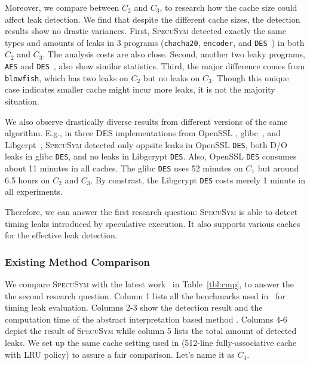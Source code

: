 \documentclass[sigconf]{acmart}
\newcommand{\SpecuSym}{\textsc{SpecuSym} }
\begin{document}
Moreover, we compare between $C_2$ and $C_3$, to research how the cache size 
could affect leak detection. We find that despite the different cache sizes, 
the detection results show no drastic variances. First, \SpecuSym detected 
exactly the same types and amounts of leaks in 3 programs (\texttt{chacha20}, 
\texttt{encoder}, and \texttt{DES}~\cite{OpenSSL111c}) in both $C_2$ and
$C_3$. The analysis costs are also close. Second, another two leaky programs, 
\texttt{AES} and \texttt{DES}~\cite{glibc}, also show similar statistics.
Third, the major difference comes from \texttt{blowfish}, which has two 
leaks on $C_2$ but no leaks on $C_3$. Though this unique case indicates 
smaller cache might incur more leaks, it is not the majority situation. 

We also observe drastically diverse results from different versions of 
the same algorithm. E.g., in three DES implementations from OpenSSL
\cite{OpenSSL111c}, glibc~\cite{glibc}, and Libgcrpt~\cite{Libgcrypt}, 
\SpecuSym detected only oppsite leaks in OpenSSL \texttt{DES}, both D/O 
leaks in glibc \texttt{DES}, and no leaks in Libgcrypt \texttt{DES}. Also, 
OpenSSL \texttt{DES} consumes about 11 minutes in all caches. The glibc 
\texttt{DES} uses 52 minutes on $C_1$ but around 6.5 hours on $C_2$ 
and $C_3$. By constrast, the Libgcrypt \texttt{DES} costs merely 1 minute in 
all experiments. 

Therefore, we can answer the first research question: \SpecuSym is able to 
detect timing leaks introduced by speculative execution. It also supports 
various caches for the effective leak detection.


\subsubsection{Existing Method Comparison}


We compare \SpecuSym with the latest work~\cite{WuW19} in Table~\ref{tbl:cmp}, 
to answer the the second research question. Column 1 lists all the benchmarks 
used in~\cite{WuW19} for timing leak evaluation. Columns 2-3 show the detection 
result and the computation time of the abstract interpretation based method 
\cite{WuW19}. Columns 4-6 depict the result of \SpecuSym while column 5 lists 
the total amount of detected leaks. We set up the same cache setting used in
\cite{WuW19} (512-line fully-associative cache with LRU policy) to assure a 
fair comparison. Let's name it as $C_4$.
\end{document}
